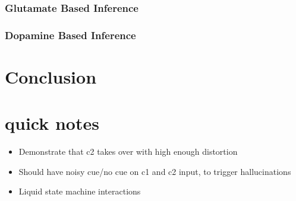 \documentclass[twocolumn]{article}
\begin{document}
\subsubsection{Glutamate Based Inference}
\subsubsection{Dopamine Based Inference}

\section{Conclusion}

\section{quick notes}
\begin{itemize}
    \item Demonstrate that c2 takes over with high enough distortion
    \item Should have noisy cue/no cue on c1 and c2 input, to trigger hallucinations
    \item Liquid state machine interactions
\end{itemize}



\end{document}
